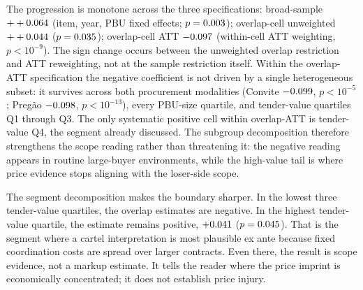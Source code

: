 The progression is monotone across the three specifications:
broad-sample $++0.064$ (item, year, PBU fixed effects;
$p=0.003$); overlap-cell unweighted $++0.044$
($p=0.035$); overlap-cell ATT $-0.097$
(within-cell ATT weighting, $p<10^{-9}$). The sign change occurs
between the unweighted overlap restriction and ATT reweighting,
not at the sample restriction itself. Within the overlap-ATT
specification the negative coefficient is not driven by a single
heterogeneous subset: it survives across both procurement
modalities (Convite $-0.099$, $p<10^{-5}$; Pregão
$-0.098$, $p<10^{-13}$), every PBU-size quartile, and
tender-value quartiles Q1 through Q3. The only systematic
positive cell within overlap-ATT is tender-value Q4, the segment
already discussed. The subgroup decomposition therefore
strengthens the scope reading rather than threatening it: the
negative reading appears in routine large-buyer environments,
while the high-value tail is where price evidence stops aligning
with the loser-side scope.

The segment decomposition makes the boundary sharper. In the
lowest three tender-value quartiles, the overlap estimates are
negative. In the highest tender-value quartile, the estimate
remains positive, $+0.041$ ($p=0.045$). That is
the segment where a cartel interpretation is most plausible ex
ante because fixed coordination costs are spread over larger
contracts. Even there, the result is scope evidence, not a
markup estimate. It tells the reader where the price imprint is
economically concentrated; it does not establish price injury.

